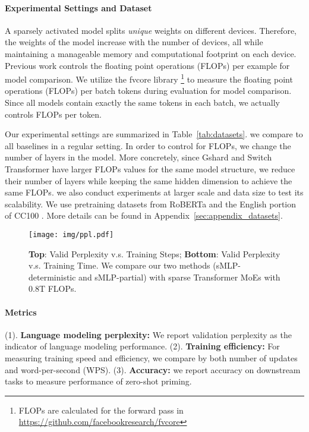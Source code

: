 \documentclass{article}
\begin{document}
\vspace{-2mm}
\paragraph{Experimental Settings and Dataset}

A sparsely activated model splits \textit{unique} weights on different devices. Therefore, the weights of the model increase with the number of devices, all while maintaining a manageable memory and computational
footprint on each device. Previous work \citep{gshard,switch,alibaba} controls the floating point operations (FLOPs) per example for model comparison. We utilize the fvcore library \footnote{FLOPs are calculated for the forward pass in \url{https://github.com/facebookresearch/fvcore}} to measure the floating point operations (FLOPs) per batch tokens during evaluation for model comparison. Since all models contain exactly the same tokens in each batch, we actually controls FLOPs per token.

Our experimental settings are summarized in Table~\ref{tab:datasets}.  we compare to all baselines in a regular setting. In order to control for FLOPs, we change the number of layers in the model. More concretely, since Gshard \citep{gshard} and Switch Transformer \citep{switch} have larger FLOPs values for the same model structure, we reduce their number of layers while keeping the same hidden dimension to achieve the same FLOPs.  we also conduct experiments at larger scale and data size to test its scalability. We use pretraining datasets from RoBERTa \citep{liu2019roberta} and the English portion of CC100 \citep{conneau2019unsupervised}. More details can be found in Appendix~\ref{sec:appendix_datasets}. 










\begin{figure}[t!]
    \centering
    \texttt{[image: img/ppl.pdf]}
    \vspace{-2mm}
    \caption{\textbf{Top}: Valid Perplexity v.s. Training Steps; \textbf{Bottom}: Valid Perplexity v.s. Training Time. We compare our two methods (sMLP-deterministic and sMLP-partial) with sparse Transformer MoEs with 0.8T FLOPs.}
\label{fig:model_comparision}
\end{figure}

\vspace{-2mm}
\paragraph{Metrics} (1). \textbf{Language modeling perplexity:} We report validation perplexity as the indicator of language modeling performance. (2). \textbf{Training efficiency:} For measuring training speed and efficiency, we compare by both number of updates and word-per-second (WPS). (3). \textbf{Accuracy:} we report accuracy on downstream tasks to measure performance of zero-shot priming. 
\end{document}
